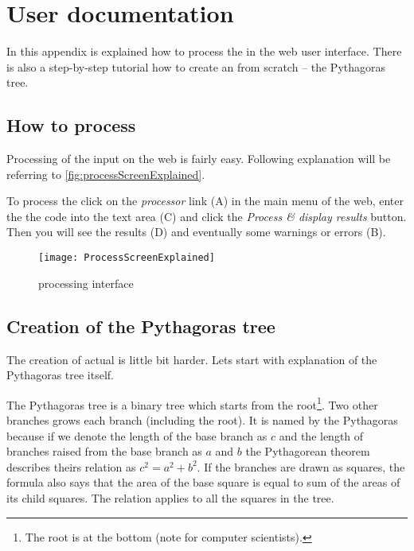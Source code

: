 

\chapter{User documentation}
\label{chap:userDoc}

In this appendix is explained how to process the \lsystems in the web user interface.
There is also a step-by-step tutorial how to create an \lsystem from scratch -- the Pythagoras tree.

\section{How to process \lsystem}

Processing of the input on the web is fairly easy.
Following explanation will be referring to \autoref{fig:processScreenExplained}.

To process the \lsystem click on the \emph{\lsystem processor} link (A) in the main menu of the web, enter the the \lsystem code into the text area (C) and click the \emph{Process \& display results} button.
Then you will see the results (D) and eventually some warnings or errors (B).

\begin{figure}[p]
	\centering
	\texttt{[image: ProcessScreenExplained]}
	\caption{\lsystem processing interface}
	\label{fig:processScreenExplained}
\end{figure}


\section{Creation of the Pythagoras tree}

The creation of actual \lsystem is little bit harder.
Lets start with explanation of the Pythagoras tree itself.

The Pythagoras tree is a binary tree which starts from the root\footnote{The root is at the bottom (note for computer scientists).}.
Two other branches grows each branch (including the root).
It is named by the Pythagoras because if we denote the length of the base branch as $c$ and the length of branches raised from the base branch as $a$ and $b$ the Pythagorean theorem describes theirs relation as $c^2 = a^2 + b^2$.
If the branches are drawn as squares, the formula also says that the area of the base square is equal to sum of the areas of its child squares.
The relation applies to all the squares in the tree.

